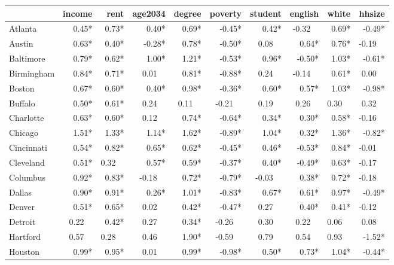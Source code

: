 \fontsize{9.5}{11.1}\selectfont
\begin{tabular}{lrrrrrrrrr}
	\toprule
	{}             & income &    rent & age2034 &  degree & poverty & student & english &   white &  hhsize \\ \midrule
	Atlanta        &  0.45* &   0.73* &   0.40* &   0.69* &  -0.45* &   0.42* & -0.32~~ &   0.69* &  -0.49* \\
	Austin         &  0.63* &   0.40* &  -0.28* &   0.78* &  -0.50* &  0.08~~ &   0.64* &   0.76* & -0.19~~ \\
	Baltimore      &  0.79* &   0.62* &   1.00* &   1.21* &  -0.53* &   0.96* &  -0.50* &   1.03* &  -0.61* \\
	Birmingham     &  0.84* &   0.71* &  0.01~~ &   0.81* &  -0.88* &  0.24~~ & -0.14~~ &   0.61* &  0.00~~ \\
	Boston         &  0.67* &   0.60* &   0.40* &   0.98* &  -0.36* &   0.60* &   0.57* &   1.03* &  -0.98* \\
	Buffalo        &  0.50* &   0.61* &  0.24~~ &  0.11~~ & -0.21~~ &  0.19~~ &  0.26~~ &  0.30~~ &  0.32~~ \\
	Charlotte      &  0.63* &   0.60* &  0.12~~ &   0.74* &  -0.64* &   0.34* &   0.30* &   0.58* & -0.16~~ \\
	Chicago        &  1.51* &   1.33* &   1.14* &   1.62* &  -0.89* &   1.04* &   0.32* &   1.36* &  -0.82* \\
	Cincinnati     &  0.54* &   0.82* &   0.65* &   0.62* &  -0.45* &   0.46* &  -0.53* &   0.84* & -0.01~~ \\
	Cleveland      &  0.51* &  0.32~~ &   0.57* &   0.59* &  -0.37* &   0.40* &  -0.49* &   0.63* & -0.17~~ \\
	Columbus       &  0.92* &   0.83* & -0.18~~ &   0.72* &  -0.79* & -0.03~~ &   0.38* &   0.72* & -0.18~~ \\
	Dallas         &  0.90* &   0.91* &   0.26* &   1.01* &  -0.83* &   0.67* &   0.61* &   0.97* &  -0.49* \\
	Denver         &  0.51* &   0.65* &  0.02~~ &   0.42* &  -0.47* &  0.27~~ &   0.40* &   0.41* & -0.12~~ \\
	Detroit        & 0.22~~ &   0.42* &  0.27~~ &   0.34* & -0.26~~ &  0.30~~ &  0.22~~ &  0.06~~ &  0.08~~ \\
	Hartford       & 0.57~~ &  0.28~~ &  0.46~~ &   1.90* & -0.59~~ &  0.79~~ &  0.54~~ &  0.93~~ &  -1.52* \\
	Houston        &  0.99* &   0.95* &  0.01~~ &   0.99* &  -0.98* &   0.50* &   0.73* &   1.04* &  -0.44* \\

\end{tabular}
